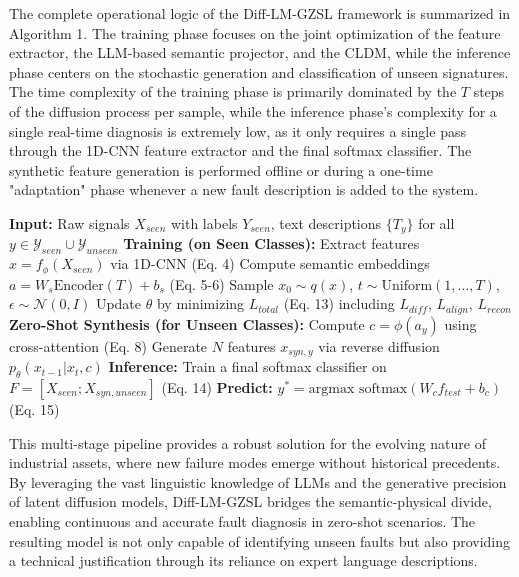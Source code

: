 \documentclass[journal]{IEEEtran}
\begin{document}
The complete operational logic of the Diff-LM-GZSL framework is summarized in Algorithm 1. The training phase focuses on the joint optimization of the feature extractor, the LLM-based semantic projector, and the CLDM, while the inference phase centers on the stochastic generation and classification of unseen signatures. The time complexity of the training phase is primarily dominated by the $T$ steps of the diffusion process per sample, while the inference phase's complexity for a single real-time diagnosis is extremely low, as it only requires a single pass through the 1D-CNN feature extractor and the final softmax classifier. The synthetic feature generation is performed offline or during a one-time "adaptation" phase whenever a new fault description is added to the system.

\begin{algorithm}
\caption{Diff-LM-GZSL: Training and Inference}
\begin{algorithmic}[1]
\STATE \textbf{Input:} Raw signals $X_{seen}$ with labels $Y_{seen}$, text descriptions $\{T_y\}$ for all $y \in \mathcal{Y}_{seen} \cup \mathcal{Y}_{unseen}$
\STATE \textbf{Training (on Seen Classes):}
\STATE \quad Extract features $x = f_\phi(X_{seen})$ via 1D-CNN (Eq. 4)
\STATE \quad Compute semantic embeddings $a = W_s \text{Encoder}(T) + b_s$ (Eq. 5-6)
\REPEAT
\STATE \quad Sample $x_0 \sim q(x)$, $t \sim \text{Uniform}(1, \dots, T)$, $\epsilon \sim \mathcal{N}(0, I)$
\STATE \quad Update $\theta$ by minimizing $L_{total}$ (Eq. 13) including $L_{diff}$, $L_{align}$, $L_{recon}$
\STATE \textbf{Zero-Shot Synthesis (for Unseen Classes):}
\STATE \quad \quad Compute $c = \phi(a_y)$ using cross-attention (Eq. 8)
\STATE \quad \quad Generate $N$ features $x_{syn, y}$ via reverse diffusion $p_\theta(x_{t-1}|x_t, c)$
\ENDFOR
\STATE \textbf{Inference:}
\STATE \quad Train a final softmax classifier on $F = [X_{seen}; X_{syn, unseen}]$ (Eq. 14)
\STATE \quad \textbf{Predict:} $y^* = \text{argmax } \text{softmax}(W_c f_{test} + b_c)$ (Eq. 15)
\end{algorithmic}
\end{algorithm}

This multi-stage pipeline provides a robust solution for the evolving nature of industrial assets, where new failure modes emerge without historical precedents. By leveraging the vast linguistic knowledge of LLMs and the generative precision of latent diffusion models, Diff-LM-GZSL bridges the semantic-physical divide, enabling continuous and accurate fault diagnosis in zero-shot scenarios. The resulting model is not only capable of identifying unseen faults but also providing a technical justification through its reliance on expert language descriptions.
\end{document}

